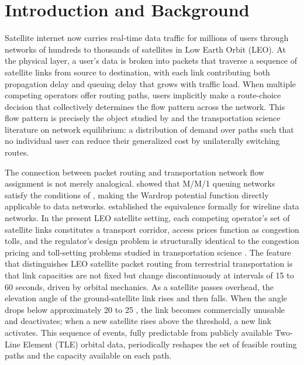 \documentclass[review,3p,authoryear]{elsarticle}
\begin{document}
\section{Introduction and Background}

Satellite internet now carries real-time data traffic for millions of users through networks of
hundreds to thousands of satellites in Low Earth Orbit (LEO). At the physical layer, a user's
data is broken into packets that traverse a sequence of satellite links from source to
destination, with each link contributing both propagation delay and queuing delay that grows
with traffic load. When multiple competing operators offer routing paths, users implicitly
make a route-choice decision that collectively determines the flow pattern across the network.
This flow pattern is precisely the object studied by \cite{wardrop1952road} and the transportation
science literature on network equilibrium: a distribution of demand over paths such that no
individual user can reduce their generalized cost by unilaterally switching routes.

The connection between packet routing and transportation network flow assignment is not
merely analogical. \cite{darroch1972} showed that M/M/1 queuing networks satisfy
the conditions of \cite{beckmann1956studies}, making the Wardrop potential function directly
applicable to data networks. \cite{bertsekas1987} established the equivalence
formally for wireline data networks. In the present LEO satellite setting, each competing
operator's set of satellite links constitutes a transport corridor, access prices function as
congestion tolls, and the regulator's design problem is structurally identical to the congestion
pricing and toll-setting problems studied in transportation science \citet{labbe1998bilevel,yang2004multi,jahn2005system}. The feature that distinguishes LEO satellite packet
routing from terrestrial transportation is that link capacities are not fixed but change
discontinuously at intervals of 15 to 60 seconds, driven by orbital mechanics. As a satellite
passes overhead, the elevation angle of the ground-satellite link rises and then falls. When
the angle drops below approximately 20 to 25 \textdegree{}, the link becomes commercially
unusable and deactivates; when a new satellite rises above the threshold, a new link activates.
This sequence of events, fully predictable from publicly available Two-Line Element (TLE)
orbital data, periodically reshapes the set of feasible routing paths and the capacity available
on each path.
\end{document}
